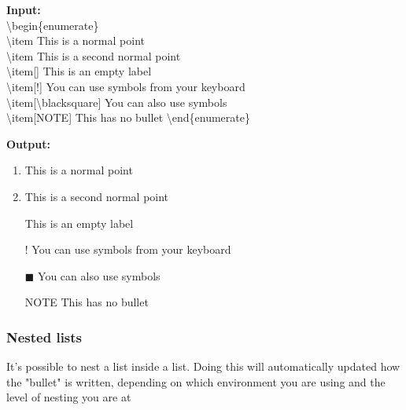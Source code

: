 \documentclass{article}
\newcommand{\jbs}[1]{\textbackslash{}#1} %
\begin{document}
\begin{multicols}{2}
    \begin{minipage}{\linewidth}
        \textbf{Input:} \\
        \jbs{begin\{enumerate\}} \\
        \jbs{item} This is a normal point \\
        \jbs{item} This is a second normal point \\
        \jbs{item}[] This is an empty label \\
        \jbs{item}[!] You can use symbols from your keyboard \\
        \jbs{item}[\jbs{blacksquare}] You can also use symbols \\
        \jbs{item}[NOTE] This has no bullet
        \jbs{end\{enumerate\}}
    \end{minipage}

    \begin{minipage}{\linewidth}
        \textbf{Output:} \\
        \begin{enumerate}
            \item This is a normal point 
            \item This is a second normal point 
            \item [] This is an empty label 
            \item [!] You can use symbols from your keyboard
            \item [$\blacksquare$] You can also use symbols
            \item [NOTE] This has no bullet
        \end{enumerate}
    \end{minipage}
\end{multicols}

\subsubsection{Nested lists}
It's possible to nest a list inside a list. Doing this will automatically updated
how the "bullet" is written, depending on which environment you are using and
the level of nesting you are at
\end{document}
